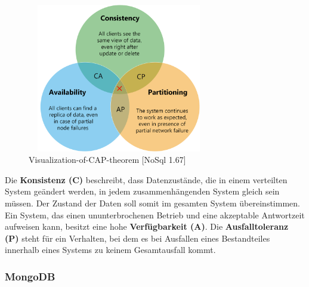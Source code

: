 \begin{figure}[h]
\centering
\includegraphics[width=8cm, height=6.5cm]{images/Visualization-of-CAP-theorem.png}
\caption{Visualization-of-CAP-theorem [NoSql 1.67]}
\end{figure}

Die \textbf{Konsistenz (C)} beschreibt, dass Datenzustände, die in einem verteilten System geändert  werden, in jedem zusammenhängenden System gleich sein müssen. Der Zustand der Daten soll somit im gesamten System übereinstimmen. Ein System, das einen ununterbrochenen Betrieb und eine akzeptable Antwortzeit aufweisen kann, besitzt eine hohe \textbf{Verfügbarkeit (A)}. Die \textbf{Ausfalltoleranz (P)} steht für ein Verhalten, bei dem es bei Ausfallen eines Bestandteiles innerhalb eines Systems  zu keinem Gesamtausfall kommt.

\newpage
\subsubsection{MongoDB}

